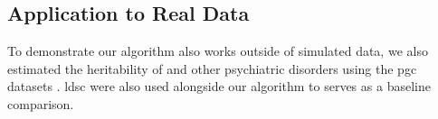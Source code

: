 	
	\subsection{Application to Real Data}
	\label{sec:realData}
	To demonstrate our algorithm also works outside of simulated data, we also estimated the heritability of  and other psychiatric disorders using the \gls{pgc} datasets \citep{Ripke2014,PsychiatricGWASConsortiumBipolarDisorderWorkingGroup2011,Ripke2013b}.
	\gls{ldsc} were also used alongside our algorithm to serves as a baseline comparison.
	
